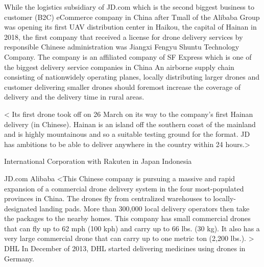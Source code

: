 While the logistics subsidiary of JD.com
which is the second biggest business to customer (B2C) eCommerce company
in China after Tmall of the Alibaba Group
was opening its first UAV distribution center in Haikou, the capital of Hainan in 2018,
the first company that received a license for drone delivery services
by responsible Chinese administration was Jiangxi Fengyu Shuntu Technology Company.
The company is an affiliated company of SF Express 
which is one of the biggest delivery service companies in China 
An airborne supply chain consisting of nationwidely operating planes,
locally distributing larger drones and customer delivering smaller drones
should foremost increase the coverage of delivery and
the delivery time in rural areas.

<
Its first drone took off on 26 March on its way to the company’s first Hainan delivery (in Chinese). Hainan is an island off the southern coast of the mainland and is highly mountainous and so a suitable testing ground for the format. JD has ambitions to be able to deliver anywhere in the country within 24 hours.>



International
Corporation with Rakuten in Japan
Indonesia




JD.com
Alibaba
<This Chinese company is pursuing a massive and rapid expansion of a commercial drone delivery system in the four most-populated provinces in China. The drones fly from centralized warehouses to locally-designated landing pads. More than 300,000 local delivery operators then take the packages to the nearby homes. This company has small commercial drones that can fly up to 62 mph (100 kph) and carry up to 66 lbs. (30 kg). It also has a very large commercial drone that can carry up to one metric ton (2,200 lbs.). >
DHL
In December of 2013, DHL started delivering medicines using drones in Germany. 

